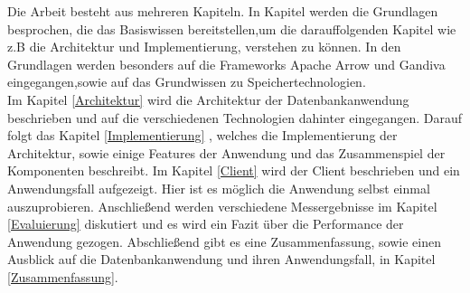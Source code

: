 Die Arbeit besteht aus mehreren Kapiteln. In Kapitel \label{Grundlagen} werden die Grundlagen besprochen, die das Basiswissen bereitstellen,um die darauffolgenden Kapitel wie z.B die Architektur und Implementierung, verstehen zu können.
In den Grundlagen werden besonders auf die Frameworks Apache Arrow und Gandiva eingegangen,sowie auf das Grundwissen zu Speichertechnologien.\\
Im Kapitel \ref{Architektur} wird die Architektur der Datenbankanwendung  beschrieben und auf die verschiedenen Technologien dahinter eingegangen. Darauf folgt das Kapitel \ref{Implementierung} , welches die Implementierung der Architektur, sowie einige Features der Anwendung und das Zusammenspiel der Komponenten beschreibt. 
Im Kapitel \ref{Client} wird der Client beschrieben und ein Anwendungsfall aufgezeigt. Hier ist es möglich die Anwendung selbst einmal auszuprobieren.
Anschließend werden verschiedene Messergebnisse im Kapitel \ref{Evaluierung} diskutiert und es wird ein Fazit über die Performance der Anwendung gezogen.
Abschließend gibt es eine Zusammenfassung, sowie einen Ausblick auf die Datenbankanwendung und ihren Anwendungsfall, in Kapitel \ref{Zusammenfassung}. 
  